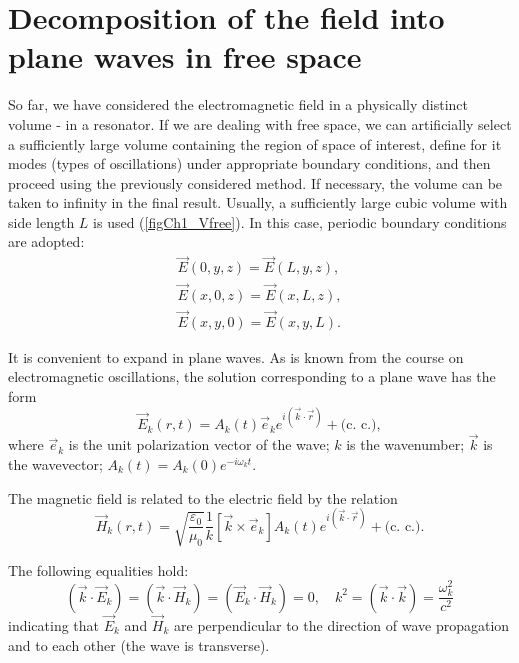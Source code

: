 \section{Decomposition of the field into plane waves in free space}
So far, we have considered the electromagnetic field in a physically
distinct volume - in a resonator. If we are dealing with free
space, we can artificially select a sufficiently large volume
containing the region of space of interest, define for it
modes (types of oscillations) under appropriate boundary conditions,
and then proceed using the previously considered method. If necessary,
the volume can be taken to infinity in the final result. Usually,
a sufficiently large cubic volume with side length $L$ is used
(\autoref{figCh1_Vfree}). In this case, periodic boundary conditions are adopted:
\begin{eqnarray}
\vec{E}\left(0, y, z \right) = \vec{E}\left(L, y, z \right),
\nonumber \\
\vec{E}\left(x, 0, z \right) = \vec{E}\left(x, L, z \right),
\nonumber \\
\vec{E}\left(x, y, 0 \right) = \vec{E}\left(x, y, L \right).
\label{eqCh1_period_def}
\end{eqnarray}



It is convenient to expand in plane waves. As is known from the course
on electromagnetic oscillations, the solution corresponding to a plane wave
has the form 
\begin{equation}
\vec{E}_k\left(r, t\right) = 
A_k\left(t\right)\vec{e}_k e^{i\left(\vec{k}\cdot\vec{r}\right)} +
\mbox{(c. c.)},
\label{eqCh1_Emode}
\end{equation}
where $\vec{e}_k$ is the unit polarization vector of the wave;  
$k$ is the wavenumber; $\vec{k}$ is the wavevector;  
$A_k\left(t\right) = A_k\left(0\right) e^{-i \omega_k t}$.

The magnetic field is related to the electric field by the relation
\begin{equation}
\vec{H}_k\left(r, t\right) =
\sqrt{\frac{\varepsilon_0}{\mu_0}}
\frac{1}{k}\left[\vec{k} \times \vec{e}_k\right] A_k\left(t\right) 
e^{i\left(\vec{k}\cdot\vec{r}\right)} + \mbox{(c. c.)}
.
\label{eqCh1_Hmode}
\end{equation}

The following equalities hold:
\begin{equation}
\left(\vec{k}\cdot\vec{E}_k\right) = 
\left(\vec{k}\cdot\vec{H}_k\right) = 
\left(\vec{E}_k \cdot \vec{H}_k\right) = 0,
\quad
k^2 = \left(\vec{k}\cdot\vec{k}\right) = 
\frac{\omega_k^2}{c^2} 
\end{equation}
indicating that 
$\vec{E}_k$
and $\vec{H}_k$ are perpendicular to the direction of wave propagation and to each other (the wave is transverse). 

